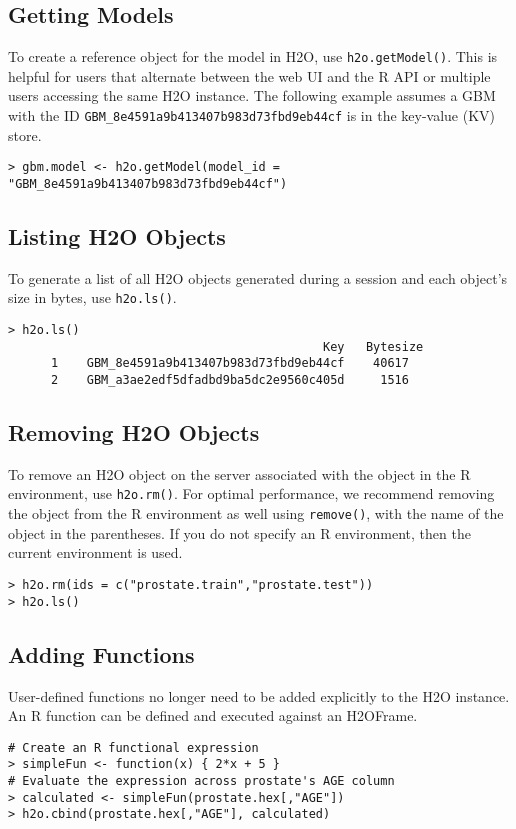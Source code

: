{\subsection{Getting Models}
To create a reference object for the model in H2O, use {\texttt{h2o.getModel()}}. This is helpful for  users that alternate between the web UI and the R API or multiple users accessing the same H2O instance. The following example assumes a GBM with the ID \texttt{GBM\_8e4591a9b413407b983d73fbd9eb44cf} is in the key-value (KV) store.

\smallskip
\begin{lstlisting}[style=R]
> gbm.model <- h2o.getModel(model_id = "GBM_8e4591a9b413407b983d73fbd9eb44cf")
\end{lstlisting}

\newpage
\subsection{Listing H2O Objects}

To generate a list of all H2O objects generated during a session and each object’s size in bytes, use {\texttt{h2o.ls()}}.
\smallskip
\small
\begin{lstlisting}[style=R]
> h2o.ls()
                                            Key   Bytesize
      1    GBM_8e4591a9b413407b983d73fbd9eb44cf    40617
      2    GBM_a3ae2edf5dfadbd9ba5dc2e9560c405d     1516
\end{lstlisting}

\normalsize 

\subsection{Removing H2O Objects}

To remove an H2O object on the server associated with the object in the R environment, use {\texttt{h2o.rm()}}. For optimal performance, we recommend removing the object from the R environment as well using {\texttt{remove()}}, with the name of the object in the parentheses. If you do not specify an R environment, then the current environment is used.
\begin{lstlisting}[style=R]
> h2o.rm(ids = c("prostate.train","prostate.test"))
> h2o.ls()
\end{lstlisting}

\subsection{Adding Functions}
User-defined functions no longer need to be added explicitly to the H2O instance. An R function can be defined and executed against an H2OFrame. 
\smallskip
\begin{lstlisting}[style=R]
# Create an R functional expression
> simpleFun <- function(x) { 2*x + 5 }
# Evaluate the expression across prostate's AGE column
> calculated <- simpleFun(prostate.hex[,"AGE"])
> h2o.cbind(prostate.hex[,"AGE"], calculated)


\end{lstlisting}}

